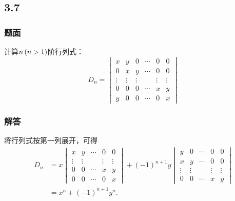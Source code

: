 \documentclass[10pt,xcolor=svgnames]{beamer} %
\begin{document}
\subsection*{3.7}
\begin{frame}
    \frametitle{题面}
    计算\(n\left( n>1 \right)\)阶行列式：
    \begin{equation*}
        D_n=
        \begin{vmatrix}
            x      & y      & 0      & \cdots & 0      & 0      \\
            0      & x      & y      & \cdots & 0      & 0      \\
            \vdots & \vdots & \vdots &        & \vdots & \vdots \\
            0      & 0      & 0      & \cdots & x      & y      \\
            y      & 0      & 0      & \cdots & 0      & x
        \end{vmatrix}
    \end{equation*}
\end{frame}
\begin{frame}
    \frametitle{解答}
    将行列式按第一列展开，可得
    \begin{align*}
        D_n & =x
        \begin{vmatrix}
            x      & y      & \cdots & 0      & 0      \\
            \vdots & \vdots &        & \vdots & \vdots \\
            0      & 0      & \cdots & x      & y      \\
            0      & 0      & \cdots & 0      & x
        \end{vmatrix}+(-1)^{n+1}y
        \begin{vmatrix}
            y      & 0      & \cdots & 0      & 0      \\
            x      & y      & \cdots & 0      & 0      \\
            \vdots & \vdots &        & \vdots & \vdots \\
            0      & 0      & \cdots & x      & y
        \end{vmatrix} \\
            & =x^n+(-1)^{n+1}y^n.
    \end{align*}
\end{frame}
\end{document}
